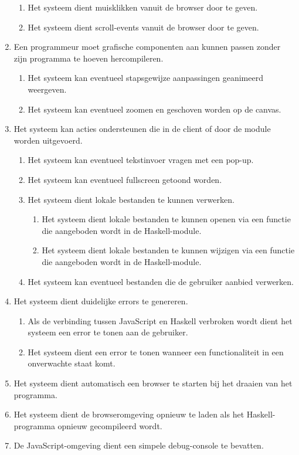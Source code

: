 \begin{enumerate}[{R}1]
\begin{enumerate}
		\item Het systeem dient muisklikken vanuit de browser door te geven.
		\item Het systeem dient scroll-events vanuit de browser door te geven.
	\end{enumerate}
	\item Een programmeur moet grafische componenten aan kunnen passen zonder zijn programma te hoeven hercompileren.
	\begin{enumerate}
		\item Het systeem kan eventueel stapsgewijze aanpassingen geanimeerd weergeven.
		\item Het systeem kan eventueel zoomen en geschoven worden op de canvas.
	\end{enumerate}
	\item Het systeem kan acties ondersteunen die in de client of door de module worden uitgevoerd.
	\begin{enumerate}
		\item Het systeem kan eventueel tekstinvoer vragen met een pop-up.
		\item Het systeem kan eventueel fullscreen getoond worden.
		\item Het systeem dient lokale bestanden te kunnen verwerken.
		\begin{enumerate}
			\item Het systeem dient lokale bestanden te kunnen openen via een functie die aangeboden wordt in de Haskell-module.
			\item Het systeem dient lokale bestanden te kunnen wijzigen via een functie die aangeboden wordt in de Haskell-module.
		\end{enumerate}
		
		\item Het systeem kan eventueel bestanden die de gebruiker aanbied verwerken.
	\end{enumerate}
	\item Het systeem dient duidelijke errors te genereren.
	\begin{enumerate}
		\item Als de verbinding tussen JavaScript en Haskell verbroken wordt dient het systeem een error te tonen aan de gebruiker. 
		\item Het systeem dient een error te tonen wanneer een functionaliteit in een onverwachte staat komt.
	\end{enumerate}
	\item Het systeem dient automatisch een browser te starten bij het draaien van het programma.
	\item Het systeem dient de browseromgeving opnieuw te laden als het Haskell-programma opnieuw gecompileerd wordt.
	\item De JavaScript-omgeving dient een simpele debug-console te bevatten.
	\setcounter{startvalue}{\value{enumi}}
\end{enumerate}

